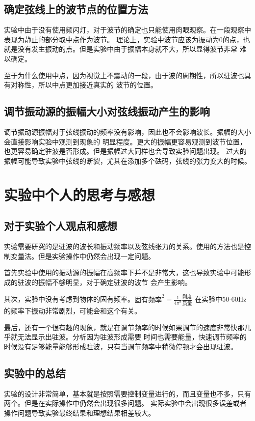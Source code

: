 \documentclass{ctexart}
\begin{document}
  \subsection{确定弦线上的波节点的位置方法}
  实验中由于没有使用频闪灯，对于波节的确定也只能使用肉眼观察。在一段观察中表现为静止的部分取中点作为波节。
  理论上，实验中波节应该为振动为0的点，也就是没有发生振动的点。但是实验中由于振幅本身就不大，所以显得波节非常
  难以确定。

  至于为什么使用中点，因为视觉上不震动的一段，由于波的周期性，所以驻波也具有对称性，所以中点更加接近真实的
  波节的位置。
  \subsection{调节振动源的振幅大小对弦线振动产生的影响}
  调节振动源振幅对于弦线振动的频率没有影响，因此也不会影响波长。振幅的大小会直接影响实验中观测到现象的
  明显程度。更大的振幅更容易观测到波节位置，也更容易确定驻波是否形成。但是振幅过大同样也会导致实验问题出现。
  过大的振幅可能导致实验中弦线的断裂，尤其在添加多个砝码，弦线的张力变大的时候。
\newpage

\section{实验中个人的思考与感想}
  \subsection{对于实验个人观点和感想}
  实验需要研究的是驻波的波长和振动频率以及弦线张力的关系。使用的方法也是控制变量法。但是实验操作中仍然会出现一定问题。

  首先实验中使用的振动源的振幅在高频率下并不是非常大，这也导致实验中可能形成的驻波的振幅不够明显，对于确定驻波的波节
  会产生影响。

  其次，实验中没有考虑到物体的固有频率。$\mbox{固有频率}^2 = \frac{1}{4\pi^2} \frac{\mbox{刚度}}{\mbox{质量}}$
  在实验中50-60Hz的频率下振动非常剧烈，可能会和这个有关。

  最后，还有一个很有趣的现象，就是在调节频率的时候如果调节的速度非常快那几乎就无法显示出驻波。分析因为驻波形成需要
  时间也需要能量，快速调节频率的时候没有足够能量能够形成驻波，只有当调节频率中稍微停顿才会出现驻波。

  \subsection{实验中的总结}
  实验的设计非常简单，基本就是按照需要控制变量进行的，而且变量也不多，只有两个。但是在实际操作中仍然会出现很多问题。
  实际实验中会出现很多误差或者操作问题导致实验最终结果和理想结果相差较大。
\end{document}
